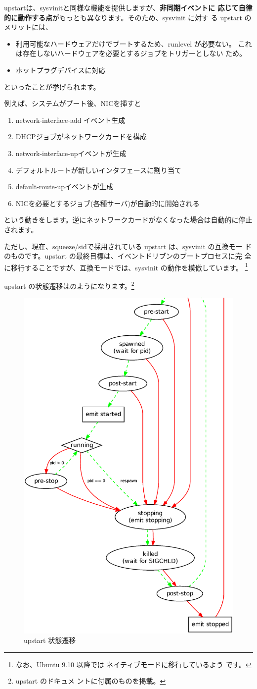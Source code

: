 \documentclass[mingoth,a4paper]{jsarticle}
\begin{document}
upstartは、sysvinitと同様な機能を提供しますが、\textbf{非同期イベントに
応じて自律的に動作する点}がもっとも異なります。そのため、sysvinit に対す
る upstart のメリットには、
\begin{itemize}
 \item 利用可能なハードウェアだけでブートするため、runlevel が必要ない。
       これは存在しないハードウェアを必要とするジョブをトリガーとしない
       ため。
 \item ホットプラグデバイスに対応
\end{itemize}
といったことが挙げられます。

例えば、システムがブート後、NICを挿すと
\begin{enumerate}
 \item network-interface-add イベント生成
 \item DHCPジョブがネットワークカードを構成
 \item network-interface-upイベントが生成
 \item デフォルトルートが新しいインタフェースに割り当て
 \item default-route-upイベントが生成
 \item NICを必要とするジョブ(各種サーバ)が自動的に開始される
\end{enumerate}
という動きをします。逆にネットワークカードがなくなった場合は自動的に停止されます。

ただし、現在、squeeze/sidで採用されている upstart は、sysvinit の互換モー
ドのものです。upstart の最終目標は、イベントドリブンのブートプロセスに完
全に移行することですが、互換モードでは、sysvinit の動作を模倣しています。
\footnote{なお、Ubuntu 9.10 以降では ネイティブモードに移行しているよう
です。}

upstart の状態遷移はのようになります。\footnote{upstart のドキュメ
ントに付属のものを掲載。}

\begin{figure}[h]
\begin{center}
\includegraphics[height=0.7\hsize]{image201002/states.eps}
\caption{upstart 状態遷移}
\label{fig:upstart-stats}
\end{center}
\end{figure}
\end{document}
